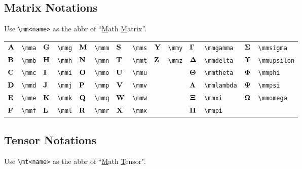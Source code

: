\documentclass{article}
\begin{document}
\subsection{Matrix Notations}
Use \lstinline`\mm<name>` as the abbr of ``\underline{M}ath \underline{M}atrix''.

\begin{tabular}{*{14}{l}}
    ${\mathbf A}$ & \lstinline`\mma`  & ${\mathbf G}$ & \lstinline`\mmg`  & ${\mathbf M}$ & \lstinline`\mmm`  & ${\mathbf S}$ & \lstinline`\mms`  & ${\mathbf Y}$ & \lstinline`\mmy` & ${\bm \Gamma}$  & \lstinline`\mmgamma`  & ${\bm \Sigma}$   & \lstinline`\mmsigma`  \\
    ${\mathbf B}$ & \lstinline`\mmb`  & ${\mathbf H}$ & \lstinline`\mmh`  & ${\mathbf N}$ & \lstinline`\mmn`  & ${\mathbf T}$ & \lstinline`\mmt`  & ${\mathbf Z}$ & \lstinline`\mmz` & ${\bm \Delta}$  & \lstinline`\mmdelta`  & ${\bm \Upsilon}$ & \lstinline`\mmupsilon`  \\
    ${\mathbf C}$ & \lstinline`\mmc`  & ${\mathbf I}$ & \lstinline`\mmi`  & ${\mathbf O}$ & \lstinline`\mmo`  & ${\mathbf U}$ & \lstinline`\mmu`  &        &                         & ${\bm \Theta}$  & \lstinline`\mmtheta`  & ${\bm \Phi}$     & \lstinline`\mmphi`  \\
    ${\mathbf D}$ & \lstinline`\mmd`  & ${\mathbf J}$ & \lstinline`\mmj`  & ${\mathbf P}$ & \lstinline`\mmp`  & ${\mathbf V}$ & \lstinline`\mmv` &        &                         & ${\bm \Lambda}$ & \lstinline`\mmlambda` & ${\bm \Psi}$     & \lstinline`\mmpsi` \\
    ${\mathbf E}$ & \lstinline`\mme` & ${\mathbf K}$ & \lstinline`\mmk` & ${\mathbf Q}$ & \lstinline`\mmq` & ${\mathbf W}$ & \lstinline`\mmw` &        &                         & ${\bm \Xi}$     & \lstinline`\mmxi` & ${\bm \Omega}$   & \lstinline`\mmomega` \\
    ${\mathbf F}$ & \lstinline`\mmf` & ${\mathbf L}$ & \lstinline`\mml` & ${\mathbf R}$ & \lstinline`\mmr` & ${\mathbf X}$ & \lstinline`\mmx` &        &                         & ${\bm \Pi}$     & \lstinline`\mmpi` &                                         \\
\end{tabular}


\subsection{Tensor Notations}
Use \lstinline`\mt<name>` as the abbr of ``\underline{M}ath \underline{T}ensor''.
\end{document}
